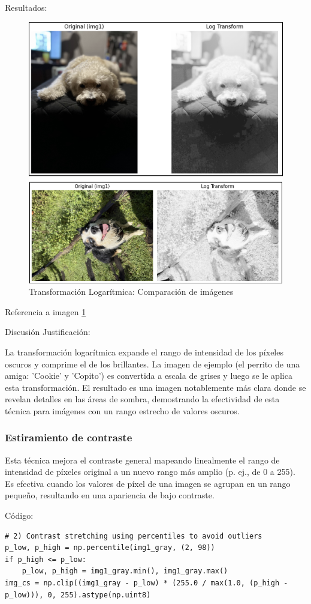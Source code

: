 \documentclass[12pt,letterpaper]{article}
\begin{document}
Resultados:
\begin{figure}[H]
  \centering
  \includegraphics[width=0.8\linewidth]{figuras/transformacion_log.png}
  \caption{Transformación Logarítmica: Comparación de imágenes}
  \label{fig:transformacion_log}
\end{figure}

Referencia a imagen \ref{fig:transformacion_log}

Discusión Justificación:

La transformación logarítmica expande el rango de intensidad de los píxeles oscuros y comprime el de los brillantes. La imagen de ejemplo (el perrito de una amiga: 'Cookie' y 'Copito') es convertida a escala de grises y luego se le aplica esta transformación. El resultado es una imagen notablemente más clara donde se revelan detalles en las áreas de sombra, demostrando la efectividad de esta técnica para imágenes con un rango estrecho de valores oscuros.


\subsubsection{Estiramiento de contraste}
Esta técnica mejora el contraste general mapeando linealmente el rango de intensidad de píxeles original a un nuevo rango más amplio (p. ej., de 0 a 255). Es efectiva cuando los valores de píxel de una imagen se agrupan en un rango pequeño, resultando en una apariencia de bajo contraste.


Código:
\begin{verbatim}
# 2) Contrast stretching using percentiles to avoid outliers
p_low, p_high = np.percentile(img1_gray, (2, 98))
if p_high <= p_low:
    p_low, p_high = img1_gray.min(), img1_gray.max()
img_cs = np.clip((img1_gray - p_low) * (255.0 / max(1.0, (p_high - p_low))), 0, 255).astype(np.uint8)
\end{verbatim}
\end{document}
